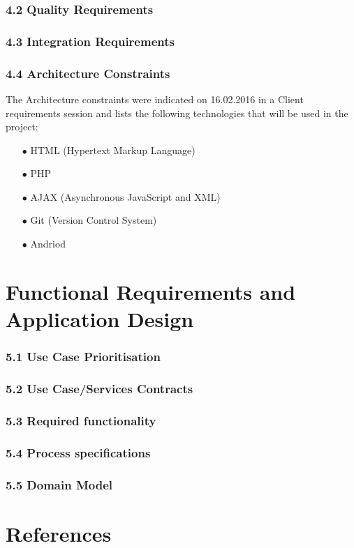 \documentclass[a4paper,12pt]{report}
\begin{document}
\subsubsection{4.2 Quality Requirements}
\subsubsection{4.3 Integration Requirements}

\subsubsection{4.4 Architecture Constraints}
The Architecture constraints were indicated on 16.02.2016 in a Client requirements session and lists the following technologies that will be used in the project:
\begin{itemize}
	\item[$\bullet$]HTML (Hypertext Markup Language) 
	\item[$\bullet$]PHP
	\item[$\bullet$]AJAX (Asynchronous JavaScript and XML)
	\item[$\bullet$]Git (Version Control System)
	\item[$\bullet$]Andriod
	\\
\end{itemize}

\newpage
\section{Functional Requirements and Application Design}
\subsubsection{5.1 Use Case Prioritisation}
\subsubsection{5.2 Use Case/Services Contracts}
\subsubsection{5.3 Required functionality}
\subsubsection{5.4 Process specifications}
\subsubsection{5.5 Domain Model}

\newpage
\section{References}
\end{document}

